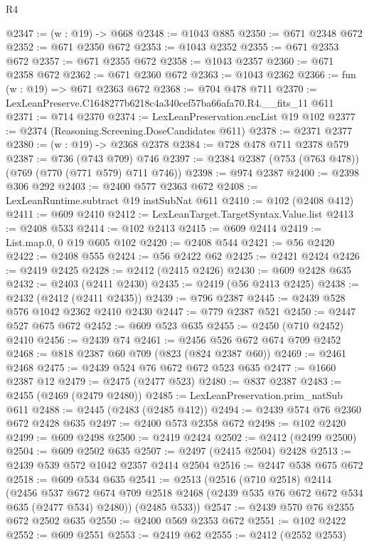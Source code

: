 \begin{lexlean}{R4}
\begin{coremodule}
@2347 := (w : @19) -> @668
@2348 := @1043 @885
@2350 := @671 @2348 @672
@2352 := @671 @2350 @672
@2353 := @1043 @2352
@2355 := @671 @2353 @672
@2357 := @671 @2355 @672
@2358 := @1043 @2357
@2360 := @671 @2358 @672
@2362 := @671 @2360 @672
@2363 := @1043 @2362
@2366 := fun (w : @19) => @671 @2363 @672
@2368 := @704 @478 @711
@2370 := LexLeanPreserve.C1648277b6218c4a340cef57ba66afa70.R4.__fits_11 @611
@2371 := @714 @2370
@2374 := LexLeanPreservation.encList @19 @102
@2377 := @2374 (Reasoning.Screening.DoseCandidates @611)
@2378 := @2371 @2377
@2380 := (w : @19) -> @2368 @2378
@2384 := @728 @478 @711 @2378 @579
@2387 := @736 (@743 @709) @746
@2397 := @2384 @2387 (@753 (@763 @478)) (@769 (@770 (@771 @579) @711 @746))
@2398 := @974 @2387
@2400 := @2398 @306 @292
@2403 := @2400 @577 @2363 @672
@2408 := LexLeanRuntime.subtract @19 instSubNat @611
@2410 := @102 (@2408 @412)
@2411 := @609 @2410
@2412 := LexLeanTarget.TargetSyntax.Value.list
@2413 := @2408 @533
@2414 := @102 @2413
@2415 := @609 @2414
@2419 := List.map.{0, 0} @19 @605 @102
@2420 := @2408 @544
@2421 := @56 @2420
@2422 := @2408 @555
@2424 := @56 @2422 @62
@2425 := @2421 @2424
@2426 := @2419 @2425
@2428 := @2412 (@2415 @2426)
@2430 := @609 @2428 @635
@2432 := @2403 (@2411 @2430)
@2435 := @2419 (@56 @2413 @2425)
@2438 := @2432 (@2412 (@2411 @2435))
@2439 := @796 @2387
@2445 := @2439 @528 @576 @1042 @2362 @2410 @2430
@2447 := @779 @2387 @521
@2450 := @2447 @527 @675 @672
@2452 := @609 @523 @635
@2455 := @2450 (@710 @2452) @2410
@2456 := @2439 @74
@2461 := @2456 @526 @672 @674 @709 @2452
@2468 := @818 @2387 @60 @709 (@823 (@824 @2387 @60))
@2469 := @2461 @2468
@2475 := @2439 @524 @76 @672 @672 @523 @635
@2477 := @1660 @2387 @12
@2479 := @2475 (@2477 @523)
@2480 := @837 @2387
@2483 := @2455 (@2469 (@2479 @2480))
@2485 := LexLeanPreservation.prim_natSub @611
@2488 := @2445 (@2483 (@2485 @412))
@2494 := @2439 @574 @76 @2360 @672 @2428 @635
@2497 := @2400 @573 @2358 @672
@2498 := @102 @2420
@2499 := @609 @2498
@2500 := @2419 @2424
@2502 := @2412 (@2499 @2500)
@2504 := @609 @2502 @635
@2507 := @2497 (@2415 @2504) @2428
@2513 := @2439 @539 @572 @1042 @2357 @2414 @2504
@2516 := @2447 @538 @675 @672
@2518 := @609 @534 @635
@2541 := @2513
    (@2516
      (@710 @2518)
      @2414
      (@2456
        @537
        @672
        @674
        @709
        @2518
        @2468
        (@2439 @535 @76 @672 @672 @534 @635 (@2477 @534) @2480))
      (@2485 @533))
@2547 := @2439 @570 @76 @2355 @672 @2502 @635
@2550 := @2400 @569 @2353 @672
@2551 := @102 @2422
@2552 := @609 @2551
@2553 := @2419 @62
@2555 := @2412 (@2552 @2553)

\end{coremodule}
\end{lexlean}

